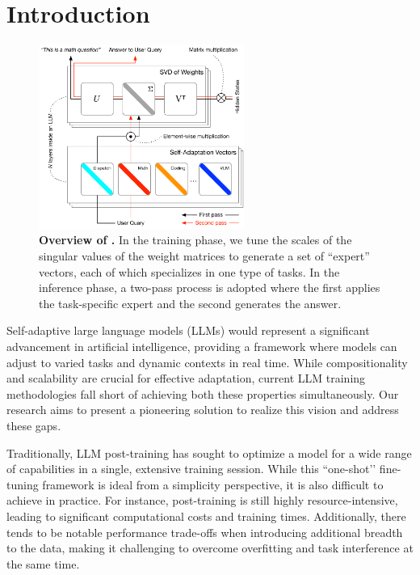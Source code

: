\vspace{-4mm}

\section{Introduction}

\label{sec:introduction}

\vspace{-2mm}

\begin{figure}
\vspace{-6mm}
    \begin{center}
    \includegraphics[width=0.6\textwidth,height=0.4\textwidth,keepaspectratio]{images/cover.pdf}
    \end{center}
  \vspace{-4mm}
  \caption{\textbf{Overview of \implname.} In the training phase, we tune the scales of the singular values of the weight matrices to generate a set of ``expert'' vectors, each of which specializes in one type of tasks. In the inference phase, a two-pass process is adopted where the first applies the task-specific expert and the second generates the answer.}
  \label{fig:cover}
  \vspace{-4mm}
\end{figure}

Self-adaptive large language models (LLMs) would represent a significant advancement in artificial intelligence, providing a framework where models can adjust to varied tasks and dynamic contexts in real time.
While compositionality and scalability are crucial for effective adaptation, current LLM training methodologies fall short of achieving both these properties simultaneously.
Our research aims to present a pioneering solution to realize this vision and address these gaps.

Traditionally, LLM post-training has sought to optimize a model for a wide range of capabilities in a single, extensive training session.
While this ``one-shot’’ fine-tuning framework is ideal from a simplicity perspective, it is also difficult to achieve in practice.
For instance, post-training is still highly resource-intensive, leading to significant computational costs and training times.
Additionally, there tends to be notable performance trade-offs when introducing additional breadth to the data, making it challenging to overcome overfitting and task interference at the same time.

